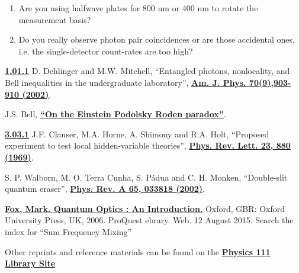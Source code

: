 \documentclass{../lab}
\begin{document}
\begin{enumerate}
    \item Are you using halfwave plates for 800 nm or 400 nm to rotate the measurement basis?

    \item Do you really observe photon pair coincidences or are those accidental ones, i.e. the single-detector count-rates are too high?
\end{enumerate}

\begin{thebibliography}{}
\label{sec:References}
    \href{http://advancedlab.berkeley.edu/mediawiki/index.php/Quantum\_Interference\_\%26\_Entanglement#cite\_ref-Dehlinger\_0-0}{\textbf{1.0}}\href{http://advancedlab.berkeley.edu/mediawiki/index.php/Quantum\_Interference\_\%26\_Entanglement#cite\_ref-Dehlinger\_0-1}{\textbf{1.1}} D. Dehlinger and M.W. Mitchell, ``Entangled photons, nonlocality, and Bell inequalities in the undergraduate laboratory'', \href{http://ajp.aapt.org/resource/1/ajpias/v70/i9/p903\_s1}{\textbf{Am. J. Phys. 70(9),903-910 (2002)}}.

    J.S. Bell, \href{http://www.drchinese.com/David/Bell_Compact.pdf}{\textbf{``On the Einstein Podolsky Roden paradox''}}.

    \href{http://advancedlab.berkeley.edu/mediawiki/index.php/Quantum\_Interference\_\%26\_Entanglement#cite\_ref-CHSH\_2-0}{\textbf{3.0}}\href{http://advancedlab.berkeley.edu/mediawiki/index.php/Quantum\_Interference\_\%26\_Entanglement#cite\_ref-CHSH\_2-1}{\textbf{3.1}} J.F. Clauser, M.A. Horne, A. Shimony and R.A. Holt, ``Proposed experiment to test local hidden-variable theories'', \href{http://prl.aps.org/abstract/PRL/v23/i15/p880/_1}{\textbf{Phys. Rev. Lett. 23, 880 (1969)}}.

    S. P. Walborn, M. O. Terra Cunha, S. Pádua and C. H. Monken, ``Double-slit quantum eraser'', \href{http://pra.aps.org/abstract/PRA/v65/i3/e033818}{\textbf{Phys. Rev. A 65, 033818 (2002)}}.

    \href{http://site.ebrary.com/lib/berkeley/reader.action?ppg=40&docID=10177967&tm=1439419508236}{\textbf{Fox, Mark. Quantum Optics : An Introduction.}} Oxford, GBR: Oxford University Press, UK, 2006. ProQuest ebrary. Web. 12 August 2015. Search the index for ``Sum Frequency Mixing''

\end{thebibliography}

\vspace{1em}

\noindent Other reprints and reference materials can be found on the \href{\LabReprints}{\textbf{Physics 111 Library Site}}
\end{document}
